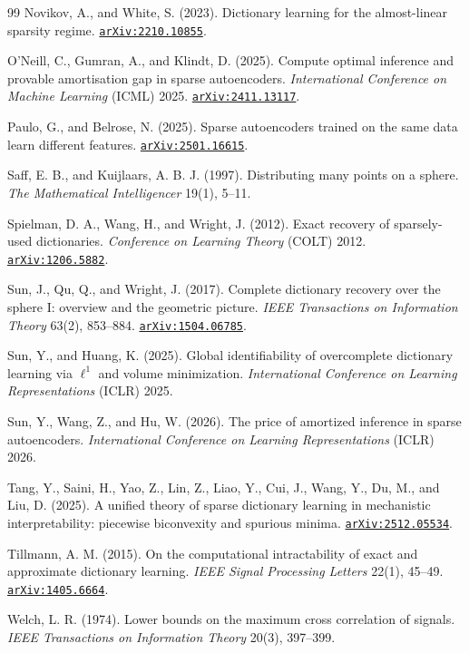 \documentclass[11pt]{amsart}
\newcommand{\arxiv}[1]{\href{https://arxiv.org/abs/#1}{\texttt{arXiv:#1}}}
\theoremstyle{plain}
\theoremstyle{definition}
\begin{document}
\begin{thebibliography}{99}
 Novikov, A., and White, S. (2023). Dictionary learning for the almost-linear sparsity regime. \arxiv{2210.10855}.

 O'Neill, C., Gumran, A., and Klindt, D. (2025). Compute optimal inference and provable amortisation gap in sparse autoencoders. \emph{International Conference on Machine Learning} (ICML) 2025. \arxiv{2411.13117}.

 Paulo, G., and Belrose, N. (2025). Sparse autoencoders trained on the same data learn different features. \arxiv{2501.16615}.

 Saff, E. B., and Kuijlaars, A. B. J. (1997). Distributing many points on a sphere. \emph{The Mathematical Intelligencer} 19(1), 5--11.

 Spielman, D. A., Wang, H., and Wright, J. (2012). Exact recovery of sparsely-used dictionaries. \emph{Conference on Learning Theory} (COLT) 2012. \arxiv{1206.5882}.

 Sun, J., Qu, Q., and Wright, J. (2017). Complete dictionary recovery over the sphere I: overview and the geometric picture. \emph{IEEE Transactions on Information Theory} 63(2), 853--884. \arxiv{1504.06785}.

 Sun, Y., and Huang, K. (2025). Global identifiability of overcomplete dictionary learning via $\ell^1$ and volume minimization. \emph{International Conference on Learning Representations} (ICLR) 2025.

 Sun, Y., Wang, Z., and Hu, W. (2026). The price of amortized inference in sparse autoencoders. \emph{International Conference on Learning Representations} (ICLR) 2026.

 Tang, Y., Saini, H., Yao, Z., Lin, Z., Liao, Y., Cui, J., Wang, Y., Du, M., and Liu, D. (2025). A unified theory of sparse dictionary learning in mechanistic interpretability: piecewise biconvexity and spurious minima. \arxiv{2512.05534}.

 Tillmann, A. M. (2015). On the computational intractability of exact and approximate dictionary learning. \emph{IEEE Signal Processing Letters} 22(1), 45--49. \arxiv{1405.6664}.

 Welch, L. R. (1974). Lower bounds on the maximum cross correlation of signals. \emph{IEEE Transactions on Information Theory} 20(3), 397--399.

\end{thebibliography}
\end{document}
